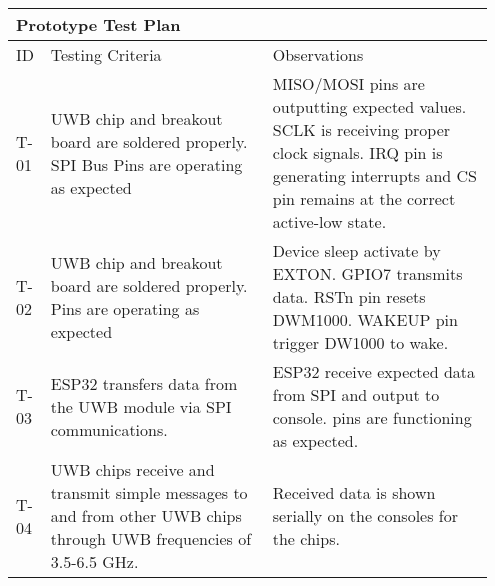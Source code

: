 \begin{table}[h!]
    \centering
    \begin{tabular}{|m{0.05\linewidth}|m{0.45\linewidth}|m{0.45\linewidth}|} 
    \hline
    \multicolumn{3}{|l|}{\textbf{Prototype Test Plan}}           \\ 
    \hline
    ID & Testing Criteria & Observations       \\ 
    \hline
    
    T-01 
    & UWB chip and breakout board are soldered properly. SPI Bus Pins are operating as expected
    & MISO/MOSI pins are outputting expected values. SCLK is receiving proper clock signals. 
    IRQ pin is generating interrupts and CS pin remains at the correct active-low state.\\ 
    \hline
    
    T-02
    & UWB chip and breakout board are soldered properly. Pins are operating as expected
    & Device sleep activate by EXTON. GPIO7 transmits data. RSTn pin resets DWM1000. WAKEUP pin trigger DW1000 to wake. \\ 
    \hline

    T-03 
    & ESP32 transfers data from the UWB module via SPI communications.
    & ESP32 receive expected data from SPI and output to console. pins are functioning as expected. \\ 
    \hline

    T-04 
    & UWB chips receive and transmit simple messages to and from other UWB chips through UWB frequencies of 3.5-6.5 GHz.
    & Received data is shown serially on the consoles for the chips.   \\ 
    \hline


\end{tabular}
\end{table}
